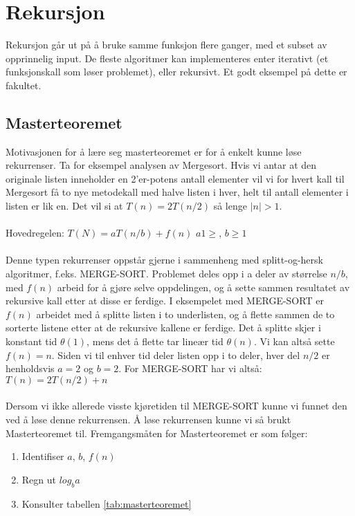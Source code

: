 \section{Rekursjon}
Rekursjon går ut på å bruke samme funksjon flere ganger, med et subset av opprinnelig input. De fleste algoritmer kan implementeres enter iterativt (et funksjonskall som løser problemet), eller rekursivt. Et godt eksempel på dette er fakultet. 

\subsection{Masterteoremet}
Motivasjonen for å lære seg masterteoremet er for å enkelt kunne løse rekurrenser. Ta for eksempel analysen av Mergesort. Hvis vi antar at den originale listen inneholder en 2’er-potens antall elementer vil vi for hvert kall til Mergesort få to nye metodekall med halve listen i hver, helt til antall elementer i listen er lik en. Det vil si at $T(n) = 2T(n/2)$ så lenge $|n| > 1$. 
\\\\
Hovedregelen: $T(N) = aT(n/b) + f(n)$   $a1\geq$, $b \geq 1$
\\\\
Denne typen rekurrenser oppstår gjerne i sammenheng med splitt-og-hersk algoritmer, f.eks. MERGE-SORT. Problemet deles opp i a deler av størrelse $n/b$, med $f(n)$ arbeid for å gjøre selve oppdelingen, og å sette sammen resultatet av rekursive kall etter at disse er ferdige. I eksempelet med MERGE-SORT er $f(n)$ arbeidet med å splitte listen i to underlisten, og å flette sammen de to sorterte listene etter at de rekursive kallene er ferdige. Det å splitte skjer i konstant tid $\theta(1)$, mens det å flette tar lineær tid $\theta(n)$. Vi kan altså sette $f(n) = n$. Siden vi til enhver tid deler listen opp i to deler, hver del $n/2$ er henholdsvis $a = 2$ og $b = 2$. For MERGE-SORT har vi altså: $T(n) = 2T(n/2) + n$
\\\\
Dersom vi ikke allerede visste kjøretiden til MERGE-SORT kunne vi funnet den ved å løse denne rekurrensen. Å løse rekurrensen kunne vi så brukt Masterteoremet til. Fremgangsmåten for Masterteoremet er som følger:
\begin{enumerate}
    \item Identifiser $a$, $b$, $f(n)$
    \item Regn ut $log_b a$
    \item Konsulter tabellen \ref{tab:masterteoremet}
\end{enumerate}

